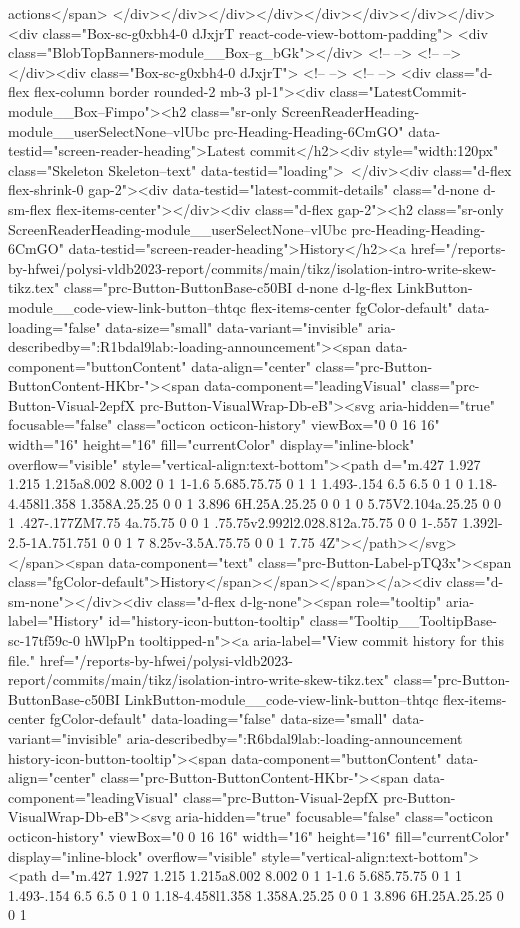 {{{{{{{{{{{{{{{{{{{{{{{{{{{{{actions</span> </div></div></div></div></div></div></div></div><div class="Box-sc-g0xbh4-0 dJxjrT react-code-view-bottom-padding"> <div class="BlobTopBanners-module__Box--g_bGk"></div> <!-- --> <!-- --> </div><div class="Box-sc-g0xbh4-0 dJxjrT"> <!-- --> <!-- --> <div class="d-flex flex-column border rounded-2 mb-3 pl-1"><div class="LatestCommit-module__Box--Fimpo"><h2 class="sr-only ScreenReaderHeading-module__userSelectNone--vlUbc prc-Heading-Heading-6CmGO" data-testid="screen-reader-heading">Latest commit</h2><div style="width:120px" class="Skeleton Skeleton--text" data-testid="loading"> </div><div class="d-flex flex-shrink-0 gap-2"><div data-testid="latest-commit-details" class="d-none d-sm-flex flex-items-center"></div><div class="d-flex gap-2"><h2 class="sr-only ScreenReaderHeading-module__userSelectNone--vlUbc prc-Heading-Heading-6CmGO" data-testid="screen-reader-heading">History</h2><a href="/reports-by-hfwei/polysi-vldb2023-report/commits/main/tikz/isolation-intro-write-skew-tikz.tex" class="prc-Button-ButtonBase-c50BI d-none d-lg-flex LinkButton-module__code-view-link-button--thtqc flex-items-center fgColor-default" data-loading="false" data-size="small" data-variant="invisible" aria-describedby=":R1bdal9lab:-loading-announcement"><span data-component="buttonContent" data-align="center" class="prc-Button-ButtonContent-HKbr-"><span data-component="leadingVisual" class="prc-Button-Visual-2epfX prc-Button-VisualWrap-Db-eB"><svg aria-hidden="true" focusable="false" class="octicon octicon-history" viewBox="0 0 16 16" width="16" height="16" fill="currentColor" display="inline-block" overflow="visible" style="vertical-align:text-bottom"><path d="m.427 1.927 1.215 1.215a8.002 8.002 0 1 1-1.6 5.685.75.75 0 1 1 1.493-.154 6.5 6.5 0 1 0 1.18-4.458l1.358 1.358A.25.25 0 0 1 3.896 6H.25A.25.25 0 0 1 0 5.75V2.104a.25.25 0 0 1 .427-.177ZM7.75 4a.75.75 0 0 1 .75.75v2.992l2.028.812a.75.75 0 0 1-.557 1.392l-2.5-1A.751.751 0 0 1 7 8.25v-3.5A.75.75 0 0 1 7.75 4Z"></path></svg></span><span data-component="text" class="prc-Button-Label-pTQ3x"><span class="fgColor-default">History</span></span></span></a><div class="d-sm-none"></div><div class="d-flex d-lg-none"><span role="tooltip" aria-label="History" id="history-icon-button-tooltip" class="Tooltip__TooltipBase-sc-17tf59c-0 hWlpPn tooltipped-n"><a aria-label="View commit history for this file." href="/reports-by-hfwei/polysi-vldb2023-report/commits/main/tikz/isolation-intro-write-skew-tikz.tex" class="prc-Button-ButtonBase-c50BI LinkButton-module__code-view-link-button--thtqc flex-items-center fgColor-default" data-loading="false" data-size="small" data-variant="invisible" aria-describedby=":R6bdal9lab:-loading-announcement history-icon-button-tooltip"><span data-component="buttonContent" data-align="center" class="prc-Button-ButtonContent-HKbr-"><span data-component="leadingVisual" class="prc-Button-Visual-2epfX prc-Button-VisualWrap-Db-eB"><svg aria-hidden="true" focusable="false" class="octicon octicon-history" viewBox="0 0 16 16" width="16" height="16" fill="currentColor" display="inline-block" overflow="visible" style="vertical-align:text-bottom"><path d="m.427 1.927 1.215 1.215a8.002 8.002 0 1 1-1.6 5.685.75.75 0 1 1 1.493-.154 6.5 6.5 0 1 0 1.18-4.458l1.358 1.358A.25.25 0 0 1 3.896 6H.25A.25.25 0 0 1 }}}}}}}}}}}}}}}}}}}}}}}}}}}}}

